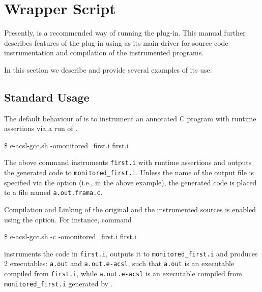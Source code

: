 \section{\eacsl Wrapper Script} %
\label{sec:wrapper}

\begin{important}
  Presently, \eacslgcc is a recommended way of running the \eacsl plug-in.
  This manual further describes features of the \eacsl plug-in using \eacslgcc
  as its main driver for source code instrumentation and compilation of the
  instrumented programs.
\end{important}

In this section we describe \eacslgcc and provide several examples of its use.

\subsection{Standard Usage}

The default behaviour of \eacslgcc is to instrument an annotated C program
with runtime assertions via a run of \framac.

\begin{shell}
\$ e-acsl-gcc.sh -omonitored_first.i first.i
\end{shell}

The above command instruments \texttt{first.i} with runtime assertions and
outputs the generated code to \texttt{monitored\_first.i}. Unless the name of
the output file is specified via the  option (i.e.,
 in the above example), the generated
code is placed to a file named \texttt{a.out.frama.c}.

Compilation and Linking of the original and the instrumented sources
is enabled using the  option.  For instance, command

\begin{shell}
\$ e-acsl-gcc.sh -c -omonitored_first.i first.i
\end{shell}

instruments the code in \texttt{first.i}, outputs it to
\texttt{monitored\_first.i} and produces 2 executables: \texttt{a.out} and
\texttt{a.out.e-acsl}, such that \texttt{a.out} is an executable compiled from
\texttt{first.i}, while \texttt{a.out.e-acsl} is an executable compiled from
\texttt{monitored\_first.i} generated by \eacsl.

